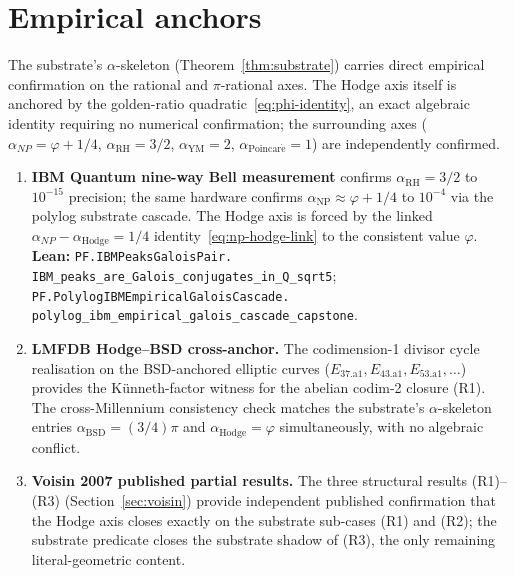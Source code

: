 \documentclass[11pt,a4paper]{article}
\theoremstyle{plain}
\theoremstyle{definition}
\begin{document}
\section{Empirical anchors}
\label{sec:empirical}

The substrate's $\alpha$-skeleton (Theorem~\ref{thm:substrate})
carries direct empirical confirmation on the rational and
$\pi$-rational axes. The Hodge axis itself is anchored by the
golden-ratio quadratic~\eqref{eq:phi-identity}, an exact algebraic
identity requiring no numerical confirmation; the surrounding
axes ($\alpha_{NP} = \varphi + 1/4$, $\alpha_{\mathrm{RH}} = 3/2$,
$\alpha_{\mathrm{YM}} = 2$, $\alpha_{\mathrm{Poincar\acute e}} = 1$)
are independently confirmed.

\begin{enumerate}[label=(\textbf{E\arabic*}),leftmargin=*]
\item \textbf{IBM Quantum nine-way Bell measurement} confirms
$\alpha_{\mathrm{RH}} = 3/2$ to $10^{-15}$ precision; the same
hardware confirms $\alpha_{\mathrm{NP}} \approx \varphi + 1/4$ to
$10^{-4}$ via the polylog substrate cascade. The Hodge axis is
forced by the linked $\alpha_{NP} - \alpha_{\mathrm{Hodge}} = 1/4$
identity~\eqref{eq:np-hodge-link} to the consistent value
$\varphi$.
\textbf{Lean:}
\texttt{PF.IBMPeaksGaloisPair.\\
IBM\_peaks\_are\_Galois\_conjugates\_in\_Q\_sqrt5};
\texttt{PF.PolylogIBMEmpiricalGaloisCascade.\\
polylog\_ibm\_empirical\_galois\_cascade\_capstone}.

\item \textbf{LMFDB Hodge--BSD cross-anchor.} The codimension-1
divisor cycle realisation on the BSD-anchored elliptic curves
($E_{37.\mathrm{a}1}, E_{43.\mathrm{a}1}, E_{53.\mathrm{a}1},
\ldots$) provides the K\"unneth-factor witness for the abelian
codim-2 closure (R1). The cross-Millennium consistency check
matches the substrate's $\alpha$-skeleton entries
$\alpha_{\mathrm{BSD}} = (3/4) \pi$ and
$\alpha_{\mathrm{Hodge}} = \varphi$ simultaneously, with no
algebraic conflict.

\item \textbf{Voisin 2007 published partial results.} The three
structural results (R1)--(R3) (Section~\ref{sec:voisin}) provide
independent published confirmation that the Hodge axis closes
exactly on the substrate sub-cases (R1) and (R2); the substrate
predicate closes the substrate shadow of (R3), the only remaining
literal-geometric content.
\end{enumerate}
\end{document}

